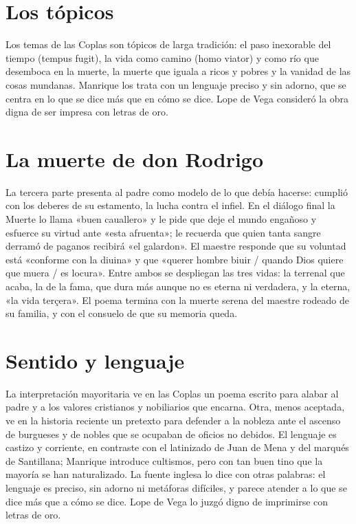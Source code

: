 \documentclass{book}
\begin{document}

\section{Los tópicos}

Los temas de las Coplas son tópicos de larga tradición: el paso inexorable del tiempo (tempus fugit), la vida como camino (homo viator) y como río que desemboca en la muerte, la muerte que iguala a ricos y pobres y la vanidad de las cosas mundanas. Manrique los trata con un lenguaje preciso y sin adorno, que se centra en lo que se dice más que en cómo se dice. Lope de Vega consideró la obra digna de ser impresa con letras de oro.


\section{La muerte de don Rodrigo}

La tercera parte presenta al padre como modelo de lo que debía hacerse: cumplió con los deberes de su estamento, la lucha contra el infiel. En el diálogo final la Muerte lo llama «buen cauallero» y le pide que deje el mundo engañoso y esfuerce su virtud ante «esta afruenta»; le recuerda que quien tanta sangre derramó de paganos recibirá «el galardon». El maestre responde que su voluntad está «conforme con la diuina» y que «querer hombre biuir / quando Dios quiere que muera / es locura». Entre ambos se despliegan las tres vidas: la terrenal que acaba, la de la fama, que dura más aunque no es eterna ni verdadera, y la eterna, «la vida terçera». El poema termina con la muerte serena del maestre rodeado de su familia, y con el consuelo de que su memoria queda.


\section{Sentido y lenguaje}

La interpretación mayoritaria ve en las Coplas un poema escrito para alabar al padre y a los valores cristianos y nobiliarios que encarna. Otra, menos aceptada, ve en la historia reciente un pretexto para defender a la nobleza ante el ascenso de burgueses y de nobles que se ocupaban de oficios no debidos. El lenguaje es castizo y corriente, en contraste con el latinizado de Juan de Mena y del marqués de Santillana; Manrique introduce cultismos, pero con tan buen tino que la mayoría se han naturalizado. La fuente inglesa lo dice con otras palabras: el lenguaje es preciso, sin adorno ni metáforas difíciles, y parece atender a lo que se dice más que a cómo se dice. Lope de Vega lo juzgó digno de imprimirse con letras de oro.
\end{document}

